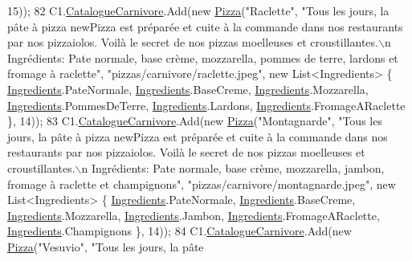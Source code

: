 \begin{DoxyCode}
       15));
82             C1.\hyperlink{classModele_1_1Catalogue_a4af9ef768f67cef6dfe545e22a6d63af}{CatalogueCarnivore}.Add(\textcolor{keyword}{new} \hyperlink{classModele_1_1Pizza}{Pizza}(\textcolor{stringliteral}{"Raclette"}, \textcolor{stringliteral}{"Tous les jours, la pâte
       à pizza newPizza est préparée et cuite à la commande dans nos restaurants par nos pizzaiolos. Voilà le
       secret de nos pizzas moelleuses et croustillantes.\(\backslash\)n Ingrédients: Pate normale, base crème, mozzarella, pommes
       de terre, lardons et fromage à raclette"}, \textcolor{stringliteral}{"pizzas/carnivore/raclette.jpeg"}, \textcolor{keyword}{new} List<Ingredients> \{ 
      \hyperlink{namespaceModele_a001a8e89e56a724f24a249ba98080d41}{Ingredients}.PateNormale, \hyperlink{namespaceModele_a001a8e89e56a724f24a249ba98080d41}{Ingredients}.BaseCreme, 
      \hyperlink{namespaceModele_a001a8e89e56a724f24a249ba98080d41}{Ingredients}.Mozzarella, \hyperlink{namespaceModele_a001a8e89e56a724f24a249ba98080d41}{Ingredients}.PommesDeTerre, 
      \hyperlink{namespaceModele_a001a8e89e56a724f24a249ba98080d41}{Ingredients}.Lardons, \hyperlink{namespaceModele_a001a8e89e56a724f24a249ba98080d41}{Ingredients}.FromageARaclette \}, 14));
83             C1.\hyperlink{classModele_1_1Catalogue_a4af9ef768f67cef6dfe545e22a6d63af}{CatalogueCarnivore}.Add(\textcolor{keyword}{new} \hyperlink{classModele_1_1Pizza}{Pizza}(\textcolor{stringliteral}{"Montagnarde"}, \textcolor{stringliteral}{"Tous les jours, la
       pâte à pizza newPizza est préparée et cuite à la commande dans nos restaurants par nos pizzaiolos. Voilà le
       secret de nos pizzas moelleuses et croustillantes.\(\backslash\)n Ingrédients: Pate normale, base crème, mozzarella,
       jambon, fromage à raclette et champignons"}, \textcolor{stringliteral}{"pizzas/carnivore/montagnarde.jpeg"}, \textcolor{keyword}{new} List<Ingredients> \{ 
      \hyperlink{namespaceModele_a001a8e89e56a724f24a249ba98080d41}{Ingredients}.PateNormale, \hyperlink{namespaceModele_a001a8e89e56a724f24a249ba98080d41}{Ingredients}.BaseCreme, 
      \hyperlink{namespaceModele_a001a8e89e56a724f24a249ba98080d41}{Ingredients}.Mozzarella, \hyperlink{namespaceModele_a001a8e89e56a724f24a249ba98080d41}{Ingredients}.Jambon, \hyperlink{namespaceModele_a001a8e89e56a724f24a249ba98080d41}{Ingredients}.FromageARaclette, 
      \hyperlink{namespaceModele_a001a8e89e56a724f24a249ba98080d41}{Ingredients}.Champignons \}, 14));
84             C1.\hyperlink{classModele_1_1Catalogue_a4af9ef768f67cef6dfe545e22a6d63af}{CatalogueCarnivore}.Add(\textcolor{keyword}{new} \hyperlink{classModele_1_1Pizza}{Pizza}(\textcolor{stringliteral}{"Vesuvio"}, \textcolor{stringliteral}{"Tous les jours, la pâte
}
\end{DoxyCode}
